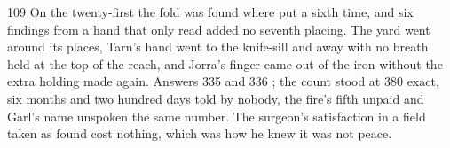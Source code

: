 \begin{CRchronicle}{109}
On the twenty-first the fold was found where put a sixth time, and six findings from a hand that only read added no seventh placing. The yard went around its places, Tarn’s hand went to the knife-sill and away with no breath held at the top of the reach, and Jorra’s finger came out of the iron without the extra holding made again. Answers 335 and 336 ; the count stood at 380 exact, six months and two hundred days told by nobody, the fire’s fifth unpaid and Garl’s name unspoken the same number. The surgeon’s satisfaction in a field taken as found cost nothing, which was how he knew it was not peace.
\end{CRchronicle}

